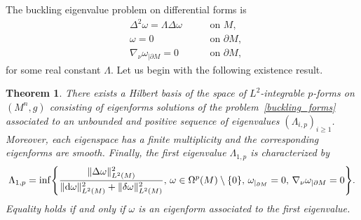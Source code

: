 \documentclass[10pt,a4paper]{amsart}
\numberwithin{equation}{section}
\newtheorem{Theorem}{Theorem}[section]
\theoremstyle{definition}
\begin{document}
The buckling eigenvalue problem on differential forms is
\begin{equation}\label{buckling_forms}
\begin{aligned}
&\Delta^2 \omega=\Lambda \Delta \omega \ \quad &&\textrm{on } M, \\
&\omega=0\ \quad &&\textrm{on }\partial M, \\
&\nabla_\nu\omega_{|\partial M}=0\ \quad &&\textrm{on }\partial M ,
\end{aligned}
\end{equation}
for some real constant $\Lambda$.
Let us begin with the following existence result.
\begin{Theorem}\label{BucKPb}
There exists a Hilbert basis of the space of $L^2$-integrable $p$-forms on $(M^n,g)$ consisting of eigenforms solutions of the problem~\eqref{buckling_forms} associated to an unbounded and positive sequence of eigenvalues $(\Lambda_{i,p})_{i\geq 1}$. Moreover, each eigenspace has a finite multiplicity and the corresponding eigenforms are smooth.
Finally, the first eigenvalue $\Lambda_{1,p}$ is characterized by
\begin{gather}\label{eq:charb}
\Lambda_{1,p}=\inf\Biggl\{\frac{\|\Delta\omega\|_{L^2(M)}^2}{
\| {\rm d}\omega\|_{L^2(M)}^2+\|\delta \omega \|_{L^2(M)}^2},\, \omega\in\Omega^p(M)\setminus\{0\},\, \omega_{|_{\partial
M}}=0,\, \nabla_\nu\omega_{|\partial M}=0\Biggr\}.
\end{gather}
Equality holds if and only if $\omega$ is an eigenform associated to the first eigenvalue.
\end{Theorem}
\end{document}
